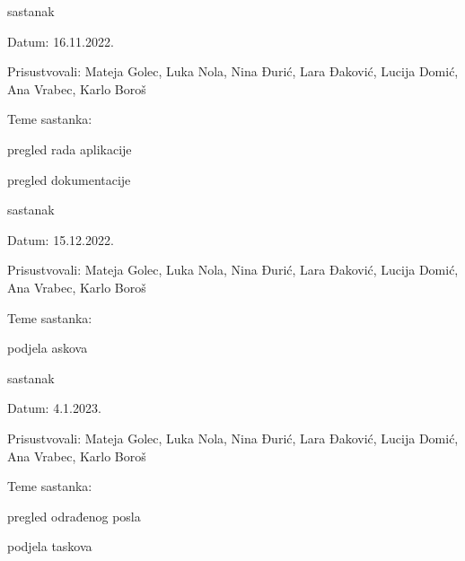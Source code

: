 \begin{packed_enum}
			\item  sastanak
			\item[] \begin{packed_item}
				\item Datum: 16.11.2022.
				\item Prisustvovali: Mateja Golec, Luka Nola, Nina Đurić, Lara Đaković, Lucija Domić, Ana Vrabec, Karlo Boroš
				\item Teme sastanka:
				\begin{packed_item}
					\item  pregled rada aplikacije
					\item  pregled dokumentacije
				\end{packed_item}
			\end{packed_item}	
			
			
			\item  sastanak
			\item[] \begin{packed_item}
				\item Datum: 15.12.2022.
				\item Prisustvovali: Mateja Golec, Luka Nola, Nina Đurić, Lara Đaković, Lucija Domić, Ana Vrabec, Karlo Boroš
				\item Teme sastanka:
				\begin{packed_item}
					\item  podjela askova
				\end{packed_item}
			\end{packed_item}

			\item  sastanak
			\item[] \begin{packed_item}
				\item Datum: 4.1.2023.
				\item Prisustvovali: Mateja Golec, Luka Nola, Nina Đurić, Lara Đaković, Lucija Domić, Ana Vrabec, Karlo Boroš
				\item Teme sastanka:
				\begin{packed_item}
					\item  pregled odrađenog posla
					\item  podjela taskova
				\end{packed_item}
			\end{packed_item}


\end{packed_enum}
